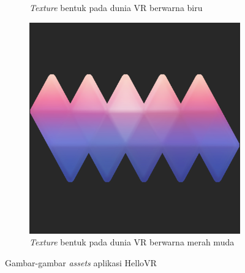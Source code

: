 \begin{figure}[]
\begin{subfigure}{.33\textwidth}
  		\caption{\textit{Texture} bentuk pada dunia VR berwarna biru \\}
  		\label{fig:blue-shape}
	\end{subfigure}
	\begin{subfigure}{.33\textwidth}
  		\centering
  		\includegraphics[width=.8\linewidth]{Gambar/shape_pink.png}
  		\caption{\textit{Texture} bentuk pada dunia VR berwarna merah muda}
  		\label{fig:pink-shape}
	\end{subfigure}
	\caption{Gambar-gambar \textit{assets} aplikasi HelloVR \\}
	\label{fig:hello-vr-assets}
\end{figure}



